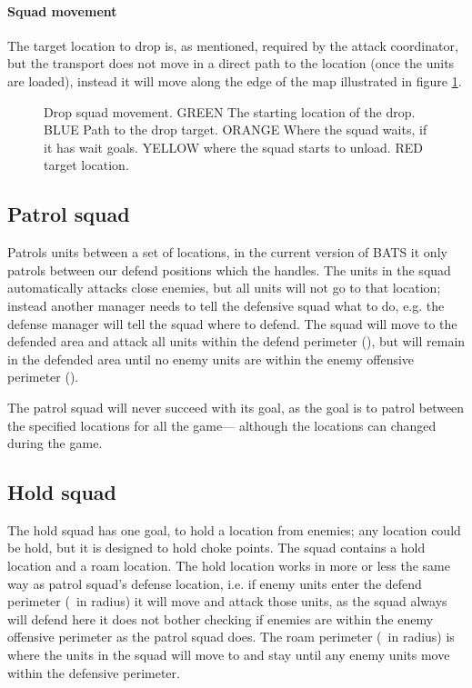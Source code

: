 \paragraph{Squad movement}
The target location to drop is, as mentioned, required by the attack coordinator, but the transport does not move in a direct path to the location (once the units are loaded), instead it will move along the edge of the map illustrated in figure \ref{fig:drop_squad_movement}.
\begin{figure}[htb]
\caption[Drop squad movement]{Drop squad movement. GREEN The starting location of the drop. BLUE Path to the drop target. ORANGE Where the squad waits, if it has wait goals. YELLOW where the squad starts to unload. RED target location.}
\label{fig:drop_squad_movement}
\end{figure}

\subsection{Patrol squad}
\label{sec:patrol_squad}
Patrols units between a set of locations, in the current version of BATS it only patrols between our defend positions which the  handles. The units in the squad automatically attacks close enemies, but all units will not go to that location; instead another manager needs to tell the defensive squad what to do, e.g. the defense manager will tell the squad where to defend. The squad will move to the defended area and attack all units within the defend perimeter (\squadDefendDefendPerimeter), but will remain in the defended area until no enemy units are within the enemy offensive perimeter (\squadDefendEnemyOffensivePerimeter).

The patrol squad will never succeed with its goal, as the goal is to patrol between the specified locations for all the game— although the locations can changed during the game.


\subsection{Hold squad}
\label{sec:hold_squad}
The hold squad has one goal, to hold a location from enemies; any location could be hold, but it is designed to hold choke points. The squad contains a hold location and a roam location. The hold location works in more or less the same way as patrol squad's defense location, i.e. if enemy units enter the defend perimeter (\squadDefendDefendPerimeter~in radius) it will move and attack those units, as the squad always will defend here it does not bother checking if enemies are within the enemy offensive perimeter as the patrol squad does. The roam perimeter (\squadDefendRoamPerimeter~in radius) is where the units in the squad will move to and stay until any enemy units move within the defensive perimeter.

